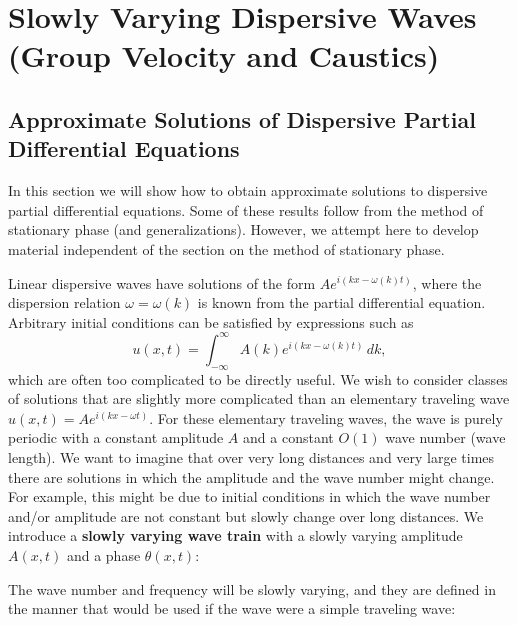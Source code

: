 \section{Slowly Varying Dispersive Waves (Group Velocity and Caustics)}
\label{sec:slowly-varying-dispersive}

\subsection{Approximate Solutions of Dispersive Partial Differential Equations}
\label{sec:approximate-solutions-dispersive}

In this section we will show how to obtain approximate solutions to dispersive partial differential equations.  Some of these results follow from the method of stationary phase (and generalizations).  However, we attempt here to develop material independent of the section on the method of stationary phase.

Linear dispersive waves have solutions of the form $Ae^{i(kx - \omega(k)t)}$, where the dispersion relation $\omega = \omega(k)$ is known from the partial differential equation.  Arbitrary initial conditions can be satisfied by expressions such as
\[
u(x,t) = \int_{-\infty}^{\infty} A(k)e^{i(kx - \omega(k)t)}\,dk,
\]
which are often too complicated to be directly useful.  We wish to consider classes of solutions that are slightly more complicated than an elementary traveling wave $u(x,t) = Ae^{i(kx - \omega t)}$.  For these elementary traveling waves, the wave is purely periodic with a constant amplitude $A$ and a constant $O(1)$ wave number (wave length).  We want to imagine that over very long distances and very large times there are solutions in which the amplitude and the wave number might change.  For example, this might be due to initial conditions in which the wave number and/or amplitude are not constant but slowly change over long distances.  We introduce a \textbf{slowly varying wave train} with a slowly varying amplitude $A(x,t)$ and a phase $\theta(x,t)$:

The wave number and frequency will be slowly varying, and they are defined in the manner that would be used if the wave were a simple traveling wave:

